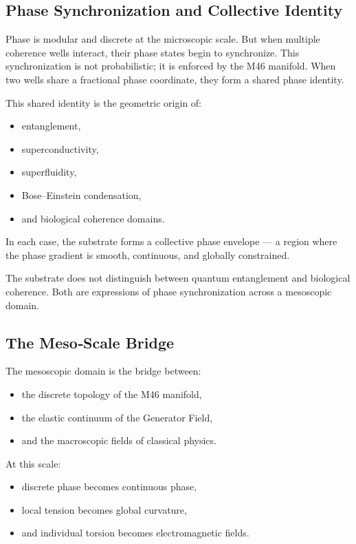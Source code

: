 \documentclass[reprint,amsmath,amssymb,aps,prl,floatfix]{revtex4-2}
\begin{document}
\begin{itemize}
\subsection{Phase Synchronization and Collective Identity}

Phase is modular and discrete at the microscopic scale. But when multiple coherence wells interact, their phase states begin to synchronize. This synchronization is not probabilistic; it is enforced by the M46 manifold. When two wells share a fractional phase coordinate, they form a shared phase identity.
\medskip

This shared identity is the geometric origin of:
\begin{itemize}
\item entanglement,  
\item superconductivity,  
\item superfluidity,  
\item Bose–Einstein condensation,  
\item and biological coherence domains.
\end{itemize}
\medskip

In each case, the substrate forms a collective phase envelope — a region where the phase gradient is smooth, continuous, and globally constrained.
\medskip

The substrate does not distinguish between quantum entanglement and biological coherence.  
Both are expressions of phase synchronization across a mesoscopic domain.

\subsection{The Meso‑Scale Bridge}

The mesoscopic domain is the bridge between:
\begin{itemize}
\item the discrete topology of the M46 manifold,  
\item the elastic continuum of the Generator Field,  
\item and the macroscopic fields of classical physics.
\end{itemize}
\medskip

At this scale:
\begin{itemize}
\item discrete phase becomes continuous phase,  
\item local tension becomes global curvature,  
\item and individual torsion becomes electromagnetic fields.
\end{itemize}
\medskip


\end{itemize}
\end{document}
